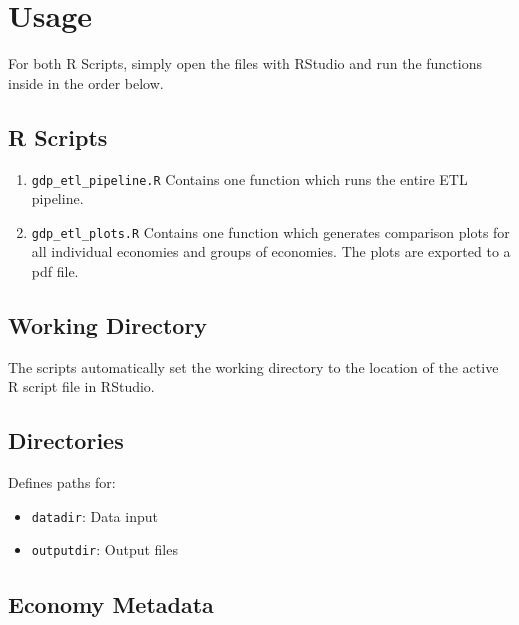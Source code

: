 \documentclass[
]{book}
\providecommand{\tightlist}{%
  \setlength{\itemsep}{0pt}\setlength{\parskip}{0pt}}
\begin{document}
\chapter{Usage}\label{usage}

For both R Scripts, simply open the files with RStudio and run the functions inside in the order below.

\section*{R Scripts}\label{r-scripts}

\begin{enumerate}
\def\labelenumi{\arabic{enumi}.}
\tightlist
\item
  \texttt{gdp\_etl\_pipeline.R} Contains one function which runs the entire ETL pipeline.
\item
  \texttt{gdp\_etl\_plots.R} Contains one function which generates comparison plots for all individual economies and groups of economies. The plots are exported to a pdf file.
\end{enumerate}

\section*{Working Directory}\label{working-directory}

The scripts automatically set the working directory to the location of the active R script file in RStudio.

\section*{Directories}\label{directories}

Defines paths for:

\begin{itemize}
\tightlist
\item
  \texttt{datadir}: Data input
\item
  \texttt{outputdir}: Output files
\end{itemize}

\section*{Economy Metadata}\label{economy-metadata}
\end{document}
